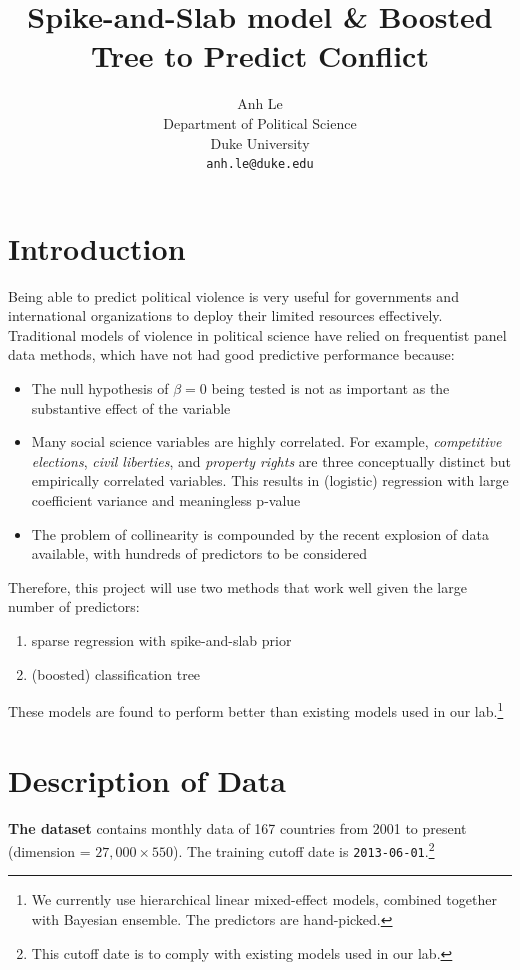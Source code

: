 \documentclass{article}
\title{Spike-and-Slab model \& Boosted Tree to Predict Conflict}
\author{Anh Le\\
Department of Political Science\\
Duke University\\
\texttt{anh.le@duke.edu} \\}
\begin{document}
\maketitle

\section*{Introduction}

Being able to predict political violence is very useful for governments and international organizations to deploy their limited resources effectively. Traditional models of violence in political science have relied on frequentist panel data methods, which have not had good predictive performance because:

\begin{itemize}[noitemsep]
\item The null hypothesis of $\beta = 0$ being tested is not as important as the substantive effect of the variable
\item Many social science variables are highly correlated. For example, \textit{competitive elections}, \textit{civil liberties}, and \textit{property rights} are three conceptually distinct but empirically correlated variables. This results in (logistic) regression with large coefficient variance and meaningless p-value
\item The problem of collinearity is compounded by the recent explosion of data available, with hundreds of predictors to be considered
\end{itemize}

Therefore, this project will use two methods that work well given the large number of predictors:
\begin{enumerate}
\item sparse regression with spike-and-slab prior
\item (boosted) classification tree
\end{enumerate}

These models are found to perform better than existing models used in our lab.\footnote{We currently use hierarchical linear mixed-effect models, combined together with Bayesian ensemble. The predictors are hand-picked.}

\section{Description of Data}

\textbf{The dataset} contains monthly data of 167 countries from 2001 to present (dimension = $27,000 \times 550$). The training cutoff date is \verb|2013-06-01|.\footnote{This cutoff date is to comply with existing models used in our lab.}
\end{document}
